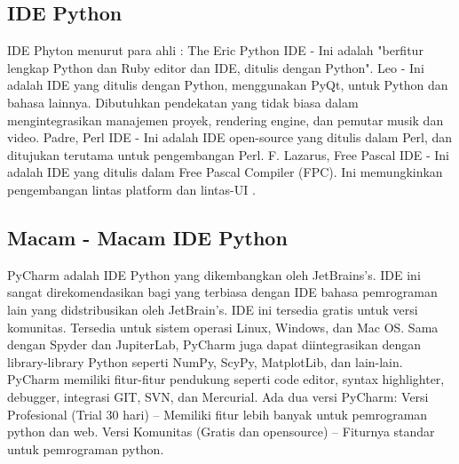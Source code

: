 \subsection{IDE Python}
IDE Phyton menurut para ahli :
The Eric Python IDE - Ini adalah "berfitur lengkap Python dan Ruby editor dan IDE, ditulis dengan Python".
Leo - Ini adalah IDE yang ditulis dengan Python, menggunakan PyQt, untuk Python dan bahasa lainnya. Dibutuhkan pendekatan yang tidak biasa dalam mengintegrasikan manajemen proyek, rendering engine, dan pemutar musik dan video.
Padre, Perl IDE - Ini adalah IDE open-source yang ditulis dalam Perl, dan ditujukan terutama untuk pengembangan Perl.
 F. Lazarus, Free Pascal IDE - Ini adalah IDE yang ditulis dalam Free Pascal Compiler (FPC). Ini memungkinkan pengembangan lintas platform dan lintas-UI \cite{swarnkar2013survey}.

\subsection{Macam - Macam IDE Python}
PyCharm adalah IDE Python yang dikembangkan oleh JetBrains’s. IDE ini sangat direkomendasikan bagi yang terbiasa dengan IDE bahasa pemrograman lain yang didstribusikan oleh JetBrain’s. IDE ini tersedia gratis untuk versi komunitas. Tersedia untuk sistem operasi Linux, Windows, dan Mac OS. Sama dengan Spyder dan JupiterLab, PyCharm juga dapat diintegrasikan dengan library-library Python seperti NumPy, ScyPy, MatplotLib, dan lain-lain. PyCharm memiliki fitur-fitur pendukung seperti code editor, syntax highlighter, debugger, integrasi GIT, SVN, dan Mercurial.
Ada dua versi PyCharm:
Versi Profesional (Trial 30 hari) – Memiliki fitur lebih banyak untuk pemrograman python dan web.
Versi Komunitas (Gratis dan opensource) – Fiturnya standar untuk pemrograman python.




